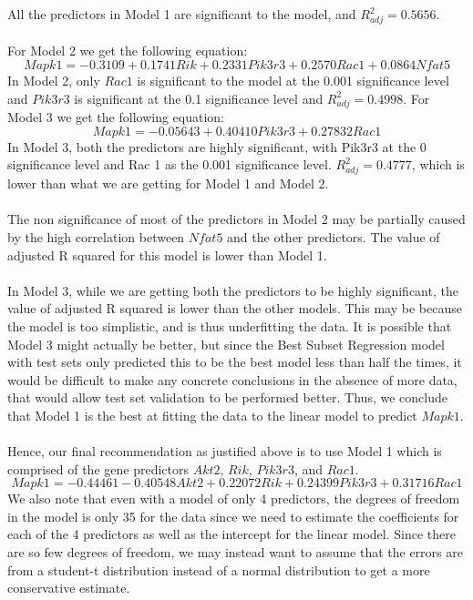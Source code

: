 \documentclass{article}
\begin{document}
All the predictors in Model 1 are significant to the model, and $R^2_{adj}=0.5656$.\\
\null\\
For Model 2 we get the following equation:
\begin{equation}
	Mapk1=-0.3109+0.1741Rik+0.2331Pik3r3+0.2570Rac1+0.0864Nfat5
	\label{eq:Model2}
\end{equation}
In Model 2, only $Rac1$ is significant to the model at the 0.001 significance level and $Pik3r3$ is significant at the 0.1 significance level and $R^2_{adj}=0.4998$.
For Model 3 we get the following equation:
\begin{equation}
	Mapk1=-0.05643+0.40410Pik3r3+0.27832Rac1
	\label{eq:Model3}
\end{equation}
In Model 3, both the predictors are highly significant, with Pik3r3 at the 0 significance level and Rac 1 as the 0.001 significance level. $R^2_{adj}=0.4777$, which is lower than what we are getting for Model 1 and Model 2. \\
\null\\
The non significance of most of the predictors in Model 2 may be partially caused by the high correlation between $Nfat5$ and the other predictors. The value of adjusted R squared for this model is lower than Model 1.\\
\null\\
In Model 3, while we are getting both the predictors to be highly significant, the value of adjusted R squared is lower than the other models. This may be because the model is too simplistic, and is thus underfitting the data. It is possible that Model 3 might actually be better, but since the Best Subset Regression model with test sets only predicted this to be the best model less than half the times, it would be difficult to make any concrete conclusions in the absence of more data, that would allow test set validation to be performed better. Thus, we conclude that Model 1 is the best at fitting the data to the linear model to predict $Mapk1$.\\
\null\\
Hence, our final recommendation as justified above is to use Model 1 which is comprised of the gene predictors $Akt2$, $Rik$, $Pik3r3$, and $Rac1$.
\begin{equation}
	Mapk1 = -0.44461-0.40548Akt2+0.22072Rik+0.24399Pik3r3+0.31716Rac1
	\label{eq:Model1}
\end{equation}
We also note that even with a model of only 4 predictors, the degrees of freedom in the model is only 35 for the data since we need to estimate the coefficients for each of the 4 predictors as well as the intercept for the linear model.  Since there are so few degrees of freedom, we may instead want to assume that the errors are from a student-t distribution instead of a normal distribution to get a more conservative estimate.
%
\end{document}
